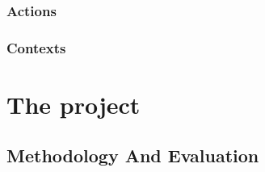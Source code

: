 \documentclass[a4paper,english]{ifimaster}
\begin{document}
\subsection{Actions}

\subsection{Contexts}




\chapter{The project}

\section{Methodology And Evaluation}






\backmatter{}
\printbibliography{}
\end{document}
